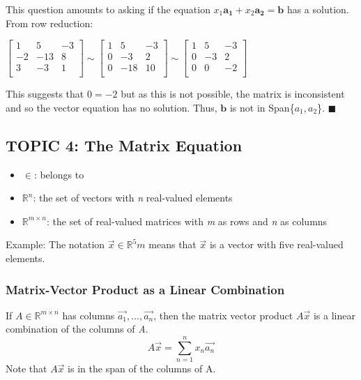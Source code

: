 \documentclass[12pt]{article} %
\newcommand{\R}{\mathbb{R}}
\begin{document}
This question amounts to asking if the equation $x_1\mathbf{a_1} + x_2\mathbf{a_2} = \mathbf{b}$ has a solution. From row reduction:
\begin{center}
	$\begin{bmatrix}
		1 & 5 & -3\\
		-2 & -13 & 8\\
		3 & -3 & 1\\
	\end{bmatrix}
	\sim
	\begin{bmatrix}
		1 & 5 & -3\\
		0 & -3 & 2\\
		0 & -18 & 10\\
	\end{bmatrix}
	\sim
	\begin{bmatrix}
		1 & 5 & -3\\
		0 & -3 & 2\\
		0 & 0 & -2\\
	\end{bmatrix}$
\end{center}
This suggests that $0 = -2$ but as this is not possible, the matrix is inconsistent and so the vector equation has no solution. Thus, $\mathbf{b}$ is not in Span\{\textbf{$a_1, a_2$}\}. $\blacksquare$



\pagebreak
\subsection{TOPIC 4: The Matrix Equation}
\begin{itemize}
\item $\in$: \indent belongs to \\
\item $\R^n$: \indent the set of vectors with \emph{n} real-valued elements\\
\item $\R^{m\times n}$: \indent the set of real-valued matrices with \emph{m} as rows and \emph{n} as columns\\
\end{itemize}

Example:
The notation $\vec{x} \in \R^5 m$ means that $\vec{x}$ is a vector with five real-valued elements.\\

\subsubsection{Matrix-Vector Product as a Linear Combination}
If $A \in \R^{m\times n}$ has columns $\vec{a_1}, ..., \vec{a_n}$, then the matrix vector product $A\vec{x}$ is a linear combination of the columns of \emph{A}. 
$$A\vec{x} = \sum_{n=1}^n x_n \vec{a_n}$$
Note that $A\vec{x}$ is in the span of the columns of A.\\
\end{document}
